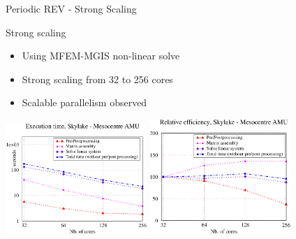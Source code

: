 \documentclass{beamer}
\begin{document}
\begin{frame}{Periodic
    REV - Strong Scaling}
  \begin{block}{Strong
      scaling}
    \begin{itemize}
      \item Using MFEM-MGIS non-linear solve
      \item Strong scaling from 32 to 256 cores
      \item Scalable parallelism observed
    \end{itemize}
  \end{block}
  \begin{block}{}
    \includegraphics[width=0.4\textwidth]{img/bench_3.png}
    \includegraphics[width=0.4\textwidth]{img/bench_4.png}
  \end{block}
\end{frame}
\end{document}
